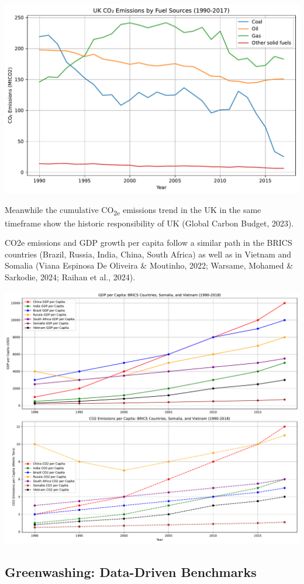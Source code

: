 \documentclass[
  letterpaper,
  DIV=11,
  numbers=noendperiod]{scrartcl}
\begin{document}
\includegraphics{_thesis_files/figure-pdf/cell-48-output-1.pdf}

Meanwhile the cumulative CO\textsubscript{2e} emissions trend in the UK
in the same timeframe show the historic responsibility of UK (Global
Carbon Budget, 2023).

CO2e emissions and GDP growth per capita follow a similar path in the
BRICS countries (Brazil, Russia, India, China, South Africa) as well as
in Vietnam and Somalia (Viana Espinosa De Oliveira \& Moutinho, 2022;
Warsame, Mohamed \& Sarkodie, 2024; Raihan et al., 2024).

\includegraphics{_thesis_files/figure-pdf/cell-49-output-1.pdf}

\subsection{Greenwashing: Data-Driven
Benchmarks}\label{greenwashing-data-driven-benchmarks}
\end{document}
